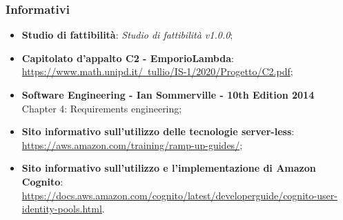     \subsubsection{Informativi}
    \begin{itemize}
        \item \textbf{Studio di fattibilità}: \textit{Studio di fattibilità v1.0.0};
        \item \textbf{Capitolato d'appalto C2 - EmporioLambda}:\\ \href{https://www.math.unipd.it/~tullio/IS-1/2020/Progetto/C2.pdf}{https://www.math.unipd.it/~tullio/IS-1/2020/Progetto/C2.pdf};
        \item \textbf{Software Engineering - Ian Sommerville - 10th Edition 2014}\\
        Chapter 4: Requirements engineering;
        \item \textbf{Sito informativo sull'utilizzo delle tecnologie server-less}:\\ \href{https://aws.amazon.com/training/ramp-up-guides/}{https://aws.amazon.com/training/ramp-up-guides/};
        \item \textbf{Sito informativo sull'utilizzo e l'implementazione di Amazon Cognito}:\\ \href{https://docs.aws.amazon.com/cognito/latest/developerguide/cognito-user-identity-pools.html}{https://docs.aws.amazon.com/cognito/latest/developerguide/cognito-user-identity-pools.html}.
    \end{itemize}